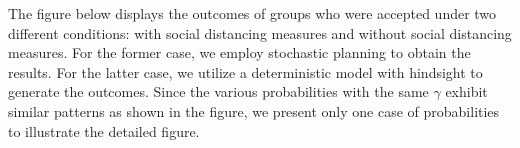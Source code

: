 


The figure below displays the outcomes of groups who were accepted under two different conditions: with social distancing measures and without social distancing measures. For the former case, we employ stochastic planning to obtain the results. For the latter case, we utilize a deterministic model with hindsight to generate the outcomes. Since the various probabilities with the same $\gamma$ exhibit similar patterns as shown in the figure, we present only one case of probabilities to illustrate the detailed figure.

